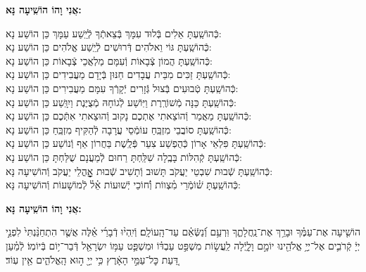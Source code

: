 \documentclass[twoside, openany, parskip=half, 11pt]{book}
\begin{document}

\label{ani vho}
\begin{large}
	\textbf{אֲנִי וָהוֹ הוֹשִֽׁיעָה נָּא:}
\end{large}



\begin{small}
	כְּֿהוֹשַֽׁעְתָּ אֵלִים בְּֿלוּד עִמָּךְ בְּֿצֵאתְֿךָ לְֿיֵֽשַׁע עַמָּךְ \hfill כֵּן הוֹשַׁע נָא: \\
	כְּֿהוֹשַֽׁעְתָּ גּוֹי וֵאלֹהִים דְּֿרוּשִׁים לְֿיֵֽשַׁע אֱלֹהִים \hfill כֵּן הוֹשַׁע נָא: \\
	כְּֿהוֹשַֽׁעְתָּ הֲמוֹן צְֿבָאוֹת וְֿעִמָּם מַלְאֲכֵי צְֿבָאוֹת \hfill כֵּן הוֹשַׁע נָא: \\
	כְּֿהוֹשַֽׁעְתָּ זַכִּים מִבֵּית עֲבָדִים חַנּוּן בְּֿיָדָם מַעֲבִידִים \hfill כֵּן הוֹשַׁע נָא: \\
	כְּֿהוֹשַֽׁעְתָּ טְֿבוּעִים בְּֿצוּל גְּֿזָרִים יְֿקָרְֿךָ עִמָּם מַעֲבִירִים \hfill כֵּן הוֹשַׁע נָא: \\
	כְּֿהוֹשַֽׁעְתָּ כַּנָּה מְֿשׁוֹרֶֽרֶת וַיּֽוֹשַׁע לְֿגוֹחָהּ מְֿצֻיֶּנֶת וַיִוָּֽשַׁע \hfill כֵּן הוֹשַׁע נָא: \\
	כְּֿהוֹשַֽׁעְתָּ מַאֲמַר וְֿהוֹצֵאתִי אֶתְכֶם נָקוּב וְֿהוּצֵאתִי אִתְּֿכֶם \hfill כֵּן הוֹשַׁע נָא:\\
	כְּֿהוֹשַֽׁעְתָּ סוֹבֲבֵי מִזְבֵּֽחַ עוֹמְֿסֵי עֲרָבָה לְֿהַקִּיף מִזְבֵּֽחַ \hfill כֵּן הוֹשַׁע נָא: \\
	כְּֿהוֹשַֽׁעְתָּ פִּלְאֵי אָרוֹן כְּֿהֻפְשַׁע צִעֵר פְּֿלֶֽשֶׁת בַּחֲרוֹן אַף וְֿנוֹשַׁע \hfill כֵּן הוֹשַׁע נָא:\\
	כְּֿהוֹשַֽׁעְתָּ קְֿהִלּוֹת בָּבֶֽלָה שִׁלַּֽחְתָּ רַחוּם לְֿמַעֲנָם שֻׁלַּחְתָּ \hfill כֵּן הוֹשַׁע נָא:\\
	
	כְּֿהוֹשַֽׁעְתָּ שְֿׁבוּת שִׁבְטֵי יַעֲקֹב תָּשׁוּב וְֿתָשִׁיב שְֿׁבוּת אׇׇׇׇׇׇׇׇָהֳלֵי יַעֲקֹב \hfill וְֿהוֹשִׁיעָה נָּא:\\
	כְּֿהוֹשַֽׁעְתָּ שׁ֗וֹמְֿרֵי מִ֗צְווֹת וְֿ֗חוֹכֵי יְֿשׁוּעוֹת אֵ֗ל֗ לְֿמוֹשָׁעוֹת \hfill וְֿהוֹשִׁיעָה נָּא:
	
\end{small}

\begin{large}
	\textbf{אֲנִי וָהוֹ הוֹשִֽׁיעָה נָּא:}
\end{large}

הוֹשִׁ֤יעָה אֶת־עַמֶּ֗ךָ וּבָרֵ֥ךְ אֶת־נַֽחֲלָתֶ֑ךָ וּֽרְעֵ֥ם וְֿ֝נַשְּֿׂאֵ֗ם עַד־הָֽעוֹלָֽם׃ וְֿיִֽהְי֨וּ דְֿבָרַ֜י אֵ֗לֶּה אֲשֶׁ֤ר הִתְחַנַּ֨נְתִּי֙ לִפְנֵ֣י יְיָ֔ קְֿרֹבִ֛ים אֶל־יְיָ֥ אֱלֹהֵ֖ינוּ יוֹמָ֣ם וָלָ֑יְֿלָה לַֽעֲשׂ֣וֹת מִשְׁפַּ֣ט עַבְדּ֗וֹ וּמִשְׁפַּ֛ט עַמּ֥וֹ יִשְׂרָאֵ֖ל דְּֿבַר־י֥וֹם בְּֿיוֹמֽוֹ׃ לְֿמַ֗עַן דַּ֚עַת כׇּל־עַמֵּ֣י הָאָ֔רֶץ כִּ֥י יְיָ֖ ה֣וּא הָֽאֱלֹהִ֑ים אֵ֖ין עֽוֹד׃
\end{document}
